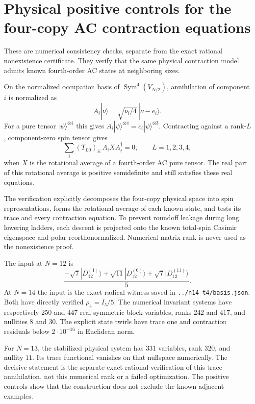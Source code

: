 \documentclass{article}
\begin{document}
\section*{Physical positive controls for the four-copy AC contraction equations}
These are numerical consistency checks, separate from the exact rational
nonexistence certificate. They verify that the same physical contraction
model admits known fourth-order AC states at neighboring sizes.

On the normalized occupation basis of $\operatorname{Sym}^4(V_{N/2})$,
annihilation of component $i$ is normalized as
\[
 A_i|\nu\rangle=\sqrt{\nu_i/4}\,|\nu-e_i\rangle.
\]
For a pure tensor $|\psi\rangle^{\otimes4}$ this gives
$A_i|\psi\rangle^{\otimes4}=c_i|\psi\rangle^{\otimes3}$.
Contracting against a rank-$L$, component-zero spin tensor gives
\[
 \sum_i(T_{L0})_{ii}\,A_i X A_i^\dagger=0,
 \qquad L=1,2,3,4,
\]
when $X$ is the rotational average of a fourth-order AC pure tensor.
The real part of this rotational average is positive semidefinite and
still satisfies these real equations.

The verification explicitly decomposes the four-copy physical space into
spin representations, forms the rotational average of each known state,
and tests its trace and every contraction equation. To prevent roundoff
leakage during long lowering ladders, each descent is projected onto the
known total-spin Casimir eigenspace and polar-reorthonormalized. Numerical
matrix rank is never used as the nonexistence proof.

The input at $N=12$ is
\[
\frac{-\sqrt7|D_{12}^{(1)}\rangle+\sqrt{11}|D_{12}^{(6)}\rangle
+\sqrt7|D_{12}^{(11)}\rangle}{5}.
\]
At $N=14$ the input is the exact radical witness saved in
\texttt{../n14-t4/basis.json}. Both have directly verified
$\rho_4=I_5/5$.
The numerical invariant systems have respectively $250$ and $447$
real symmetric block variables, ranks $242$ and $417$, and nullities
$8$ and $30$. The explicit state twirls have trace one and contraction
residuals below $2\cdot10^{-16}$ in Euclidean norm.

For $N=13$, the stabilized physical system has $331$ variables,
rank $320$, and nullity $11$. Its trace functional vanishes on that
nullspace numerically. The decisive statement is the separate exact
rational verification of this trace annihilation, not this numerical rank
or a failed optimization. The positive controls show that the construction
does not exclude the known adjacent examples.
\end{document}
